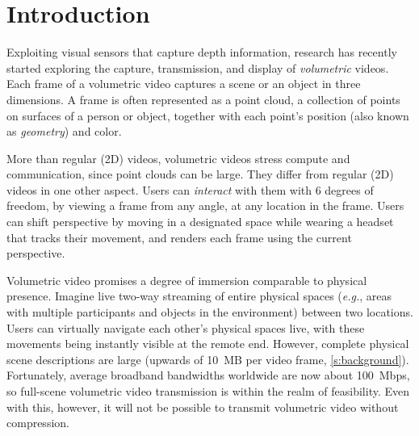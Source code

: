 \section{Introduction}
\label{s:introduction}

Exploiting visual sensors that capture depth information, research has recently started exploring the capture, transmission, and display of \textit{volumetric} videos.
%
Each frame of a volumetric video captures a scene or an object in three dimensions.
%
A frame is often represented as a point cloud, a collection of points on surfaces of a person or object, together with each point's position (also known as \textit{geometry}) and color.

More than regular (2D) videos, volumetric videos stress compute and communication, since point clouds can be large.
%
They differ from regular (2D) videos in one other aspect.
%
Users can \textit{interact} with them with 6 degrees of freedom, by viewing a frame from any angle, at any location in the frame.
%
Users can shift perspective by moving in a designated space while wearing a headset that tracks their movement, and renders each frame using the current perspective.

Volumetric video promises a degree of immersion comparable to physical presence.
%
Imagine live two-way streaming of entire physical spaces
(\textit{e.g.}, areas with multiple participants and objects in the environment) between two locations.
%
Users can virtually navigate each other's physical spaces live, with these movements being instantly visible at the remote end.
%
However, complete physical scene descriptions are large (upwards of 10~MB per video frame, \cref{s:background}).
%
Fortunately, average broadband bandwidths worldwide are now about 100~Mbps, so full-scene volumetric video transmission is within the realm of feasibility.
%
Even with this, however, it will not be possible to transmit volumetric video without compression.


